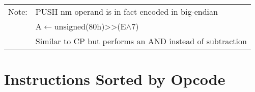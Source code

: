 \documentclass[oneside,a4paper]{book}
\begin{document}
{\begin{tabular}{llcccccccccccccccl}
		\hline

		Note:
			& \multicolumn{17}{l}{\parbox{12cm}{\footnotemark[1] PUSH nm operand is in fact encoded in big-endian}}\notet \\

			& \multicolumn{17}{l}{\parbox{12cm}{\footnotemark[2] A$\leftarrow$unsigned(80h)>>(E$\wedge$7)}} \\

			& \multicolumn{17}{l}{\parbox{12cm}{\footnotemark[3] Similar to CP but performs an AND instead of subtraction}}\noteb \\

		\hline

	\end{tabular}
}

\stopcontents[intrstructionsections]



\chapter{Instructions Sorted by Opcode}
\end{document}
